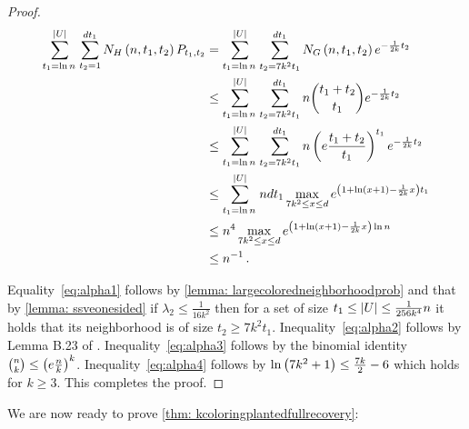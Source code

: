 \begin{proof}
    \begin{align}
    \sum_{t_1=\ln n\,}^{\Abs{U}}\sum_{t_2=1}^{d t_1}N_{H}\Paren{n,t_1,t_2}P_{t_1,t_2} & =\sum_{t_1=\ln n\,}^{\Abs{U}}\sum_{t_2= 7k^2t_1 }^{d t_1}N_{G}\Paren{n,t_1,t_2}e^{-\frac{1}{2k} t_2}\label{eq:alpha1}\\
    & \le\sum_{t_1=\ln n\,}^{\Abs{U}}\sum_{t_2= 7k^2t_1 }^{d t_1}n\binom{t_1+t_2 }{ t_1}e^{-\frac{1}{2k} t_2}\label{eq:alpha2}\\
    & \le\sum_{t_1=\ln n\,}^{\Abs{U}}\sum_{t_2= 7k^2t_1 }^{d t_1}n\Paren{e\frac{t_1+t_2}{t_1}}^{t_1}e^{-\frac{1}{2k} t_2}\label{eq:alpha3}\\
    & \le\sum_{t_1=\ln n\,}^{\Abs{U}}ndt_1\max_{7k^2\le x\le d}e^{\Paren{1+\ln(x+1)-\frac{1}{2k} x}t_1}\nonumber \\
    & \le n^{4}\max_{7k^2\le x\le d}e^{\Paren{1+\ln(x+1)-\frac{1}{2k} x}\ln{n}}\nonumber\\
    & \le n^{-1}\,.\label{eq:alpha4}
    \end{align}

    Equality~\ref{eq:alpha1} follows by \cref{lemma: largecoloredneighborhoodprob} and that by \cref{lemma: ssveonesided}
    if $\lambda_2\le \frac{1}{16k^2}$ then for a set of size $t_1\le\left\lvert U\right\rvert\le\frac{1}{256k^4}n$ it holds that its neighborhood is of size $t_2\ge7k^2t_1$. Inequality~\ref{eq:alpha2} follows by Lemma B.23 of \cite{MR3536556-David16}. Inequality~\ref{eq:alpha3} follows by the binomial identity ${n \choose k}\le\left(e\frac{n}{k}\right)^{k}$. Inequality~\ref{eq:alpha4} follows by $\ln\left(7k^2+1\right)\leq \frac{7k}{2}-6$ which holds for $k\geq 3$. This completes the proof.
\end{proof}

We are now ready to prove \cref{thm: kcoloringplantedfullrecovery}:

